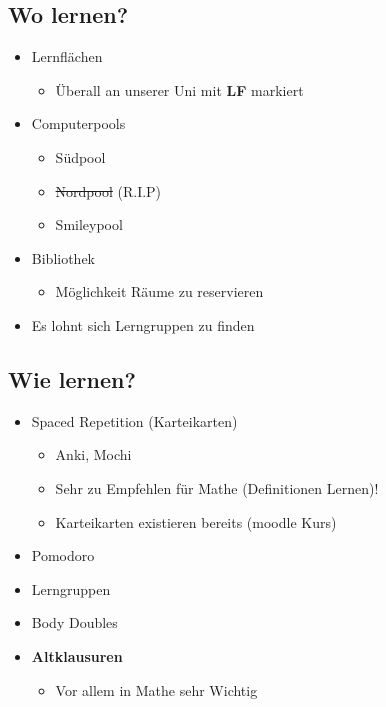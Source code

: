 \documentclass[
	aspectratio=169, 
	10pt 
]{beamer}
\begin{document}
\subsection{Wo lernen?}
\begin{frame}{\insertsubsection}
    \begin{itemize}
        \item Lernflächen \begin{itemize} \item Überall an unserer Uni mit \textbf{LF} markiert \end{itemize}
        \item Computerpools \begin{itemize}
            \item Südpool
            \item \sout{Nordpool} (R.I.P)
            \item Smileypool \end{itemize}
        \item Bibliothek \begin{itemize} \item Möglichkeit Räume zu reservieren \end{itemize}
        \item[$\rightarrow$] Es lohnt sich Lerngruppen zu finden 
    \end{itemize}
\end{frame}

\subsection{Wie lernen?}
\begin{frame}{\insertsubsection}
    \begin{itemize}
        \item Spaced Repetition (Karteikarten) \begin{itemize}
            \item Anki, Mochi
            \item Sehr zu Empfehlen für Mathe (Definitionen Lernen)! 
            \item[$\rightarrow$] Karteikarten existieren bereits (moodle Kurs) 
        \end{itemize}
        \item Pomodoro
        \item Lerngruppen
        \item Body Doubles 
        \item \textbf{Altklausuren} \begin{itemize}
            \item Vor allem in Mathe sehr Wichtig
        \end{itemize}
    \end{itemize}
\end{frame}
\end{document}
